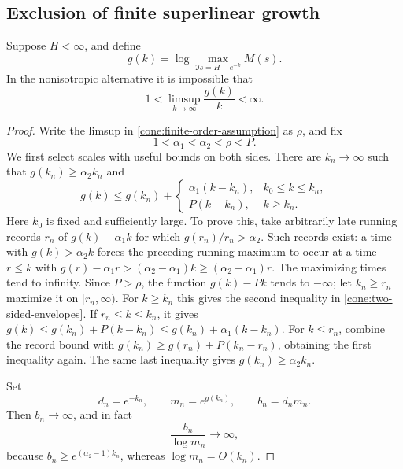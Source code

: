 \subsection{Exclusion of finite superlinear growth}

\begin{theorem}\label{thm:finite-superlinear-exclusion}
Suppose \(H<\infty\), and define
\[
 g(k)=\log\max_{\Im s=H-e^{-k}}M(s).
\]
In the nonisotropic alternative it is impossible that
\begin{equation}\label{cone:finite-order-assumption}
 1<\limsup_{k\to\infty}\frac{g(k)}{k}<\infty.
\end{equation}
\end{theorem}

\begin{proof}
Write the limsup in \eqref{cone:finite-order-assumption} as \(\rho\),
and fix
\[
 1<\alpha_1<\alpha_2<\rho<P.
\]
We first select scales with useful bounds on both sides. There are
\(k_n\to\infty\) such that \(g(k_n)\ge\alpha_2k_n\) and
\begin{equation}\label{cone:two-sided-envelopes}
 g(k)\le g(k_n)+
 \begin{cases}
 \alpha_1(k-k_n),&k_0\le k\le k_n,\\
 P(k-k_n),&k\ge k_n.
 \end{cases}
\end{equation}
Here \(k_0\) is fixed and sufficiently large. To prove this, take
arbitrarily late running records \(r_n\) of \(g(k)-\alpha_1k\) for
which \(g(r_n)/r_n>\alpha_2\). Such records exist: a time with
\(g(k)>\alpha_2k\) forces the preceding running maximum to occur at a
time \(r\le k\) with
\(g(r)-\alpha_1r>(\alpha_2-\alpha_1)k\ge(\alpha_2-\alpha_1)r\).
The maximizing times tend to infinity. Since \(P>\rho\), the function
\(g(k)-Pk\) tends to \(-\infty\); let \(k_n\ge r_n\) maximize it on
\([r_n,\infty)\). For \(k\ge k_n\) this gives the second inequality
in \eqref{cone:two-sided-envelopes}. If \(r_n\le k\le k_n\), it gives
\(g(k)\le g(k_n)+P(k-k_n)\le g(k_n)+\alpha_1(k-k_n)\).
For \(k\le r_n\), combine the record bound with
\(g(k_n)\ge g(r_n)+P(k_n-r_n)\), obtaining the first inequality again.
The same last inequality gives \(g(k_n)\ge\alpha_2 k_n\).

Set
\begin{equation}\label{cone:superlinear-scales}
 d_n=e^{-k_n},\qquad m_n=e^{g(k_n)},\qquad b_n=d_nm_n.
\end{equation}
Then \(b_n\to\infty\), and in fact
\begin{equation}\label{cone:b-dominates-log}
 \frac{b_n}{\log m_n}\longrightarrow\infty,
\end{equation}
because \(b_n\ge e^{(\alpha_2-1)k_n}\), whereas
\(\log m_n=O(k_n)\).


\end{proof}

